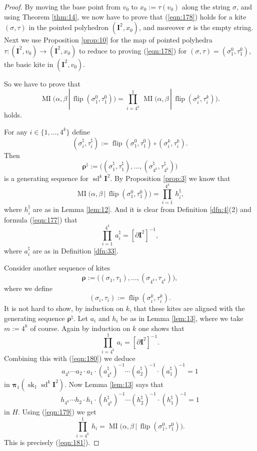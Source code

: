 \documentclass[10pt, a4paper]{amsart}
\theoremstyle{definition}
\numberwithin{equation}{section}
\newcommand{\opn}{\operatorname}
\newcommand{\mbf}[1]{\mathbf{#1}}
\newcommand{\bsym}[1]{\boldsymbol{#1}}
\renewcommand{\vert}{\, | \,}
\begin{document}
\begin{proof}
By moving the base point from $v_0$ to $x_0 := \tau(v_0)$ along the string
$\sigma$, and using Theorem \ref{thm:14}, we now have to prove that 
(\ref{eqn:178}) holds for a kite $(\sigma, \tau)$ in the pointed polyhedron
$(\mbf{I}^2, x_0)$, and moreover $\sigma$ is the empty string. 
Next we use Proposition \ref{prop:10} for the map of pointed polyhedra
$\tau : (\mbf{I}^2, v_0) \to (\mbf{I}^2, x_0)$ to reduce to proving 
(\ref{eqn:178}) for $(\sigma, \tau) = (\sigma^0_1, \tau^0_1)$,
the basic kite  in $(\mbf{I}^2, v_0)$.

So we have to prove that 
\begin{equation} \label{eqn:181}
\opn{MI} \bigl( \alpha, \beta \vert \opn{flip}(\sigma^0_1, \tau^0_1) \bigr) = 
\prod_{i = 4^k}^1 \, 
\opn{MI} \bigl( \alpha, \beta \vert \opn{flip}(\sigma^k_i, \tau^k_i) \bigr) .
\end{equation}
holds. 

For any $i \in \{ 1, \ldots, 4^k \}$ define
\[ (\sigma^{\natural}_i, \tau^{\natural}_i) :=
\opn{flip} (\sigma^0_1, \tau^0_1) \circ (\sigma^k_i, \tau^k_i) . \]
Then 
\[ \bsym{\rho}^{\natural} := \bigl( (\sigma^{\natural}_1, \tau^{\natural}_1),
\ldots, (\sigma^{\natural}_{4^k}, \tau^{\natural}_{4^k}) \bigr) \]
is a generating sequence for $\opn{sd}^k \mbf{I}^2$. By Proposition
\ref{prop:3} we know that
\begin{equation} \label{eqn:179}
\opn{MI} \bigl( \alpha, \beta \vert \opn{flip}(\sigma^0_1, \tau^0_1) \bigr) = 
\prod_{i = 1}^{4^k} \, h^{\natural}_i ,
\end{equation}
where $h^{\natural}_i$ are as in Lemma \ref{lem:12}.
And it is clear from Definition \ref{dfn:4}(2) and formula (\ref{eqn:177}) that 
\begin{equation} \label{eqn:180}
\prod_{i = 1}^{4^k} \, a^{\natural}_i = [ \partial \mbf{I}^2 ] ^{-1} ,
\end{equation}
where $a^{\natural}_i$ are as in Definition \ref{dfn:33}.

Consider another sequence of kites
\[ \bsym{\rho} := \bigl( (\sigma^{}_1, \tau^{}_1),
\ldots, (\sigma^{}_{4^k}, \tau^{}_{4^k}) \bigr) , \]
where we define
\[ (\sigma_i, \tau_i) := \opn{flip}(\sigma^k_i, \tau^k_i) . \]
It is not hard to show, by induction on $k$, that these kites are aligned with
the generating sequence $\bsym{\rho}^{\natural}$.
Let $a_i$ and $h_i$ be as in Lemma \ref{lem:13}, where we take 
$m := 4^k$ of course. Again by induction on $k$ one shows that 
\[ \prod_{i = 4^k}^1 \, a_i = [ \partial \mbf{I}^2 ] ^{-1} . \]
Combining this with (\ref{eqn:180}) we deduce
\[ a_{4^k} \cdots a_2 \cdot a_1 \cdot 
(a^{\natural}_{4^k})^{-1} \cdots (a^{\natural}_2)^{-1} \cdot
(a^{\natural}_1)^{-1} = 1  \]
in $\bsym{\pi}_1(\opn{sk}_1 \opn{sd}^k \mbf{I}^2)$.
Now Lemma \ref{lem:13} says that 
\[  h_{4^k} \cdots h_2 \cdot h_1 \cdot 
(h^{\natural}_{4^k})^{-1} \cdots (h^{\natural}_2)^{-1} \cdot
(h^{\natural}_1)^{-1} = 1 \]
in $H$. Using (\ref{eqn:179}) we get
\[ \prod_{i = 4^k}^1 \, h_i =
\opn{MI} \bigl( \alpha, \beta \vert \opn{flip}(\sigma^0_1, \tau^0_1) \bigr) . \]
This is precisely (\ref{eqn:181}).
\end{proof}
\end{document}
